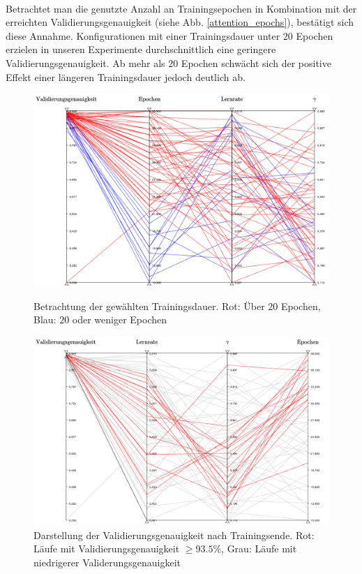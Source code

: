 \\
Betrachtet man die genutzte Anzahl an Trainingsepochen in Kombination mit der erreichten Validierungsgenauigkeit (siehe Abb. \ref{attention_epochs}), bestätigt sich diese Annahme. Konfigurationen mit einer Trainingsdauer unter $20$ Epochen erzielen in unseren Experimente durchschnittlich eine geringere Validierungsgenauigkeit. Ab mehr als $20$ Epochen schwächt sich der positive Effekt einer längeren Trainingsdauer jedoch deutlich ab.
\\
\begin{figure}[h]
\includegraphics[scale=0.58]{NNOPT/attention_epochs.pdf}
\caption{Betrachtung der gewählten Trainingsdauer. Rot: Über $20$ Epochen, Blau: $20$ oder weniger Epochen}
\label{attention_epochs}
\includegraphics[scale=0.58]{NNOPT/attention_top_runs.pdf}
\caption{Darstellung der Validierungsgenauigkeit nach Trainingsende. Rot: Läufe mit Validierungsgenauigkeit $\geq 93.5\%$, Grau: Läufe mit niedrigerer Validerungsgenauigkeit}
\label{attention_top}
\end{figure}
